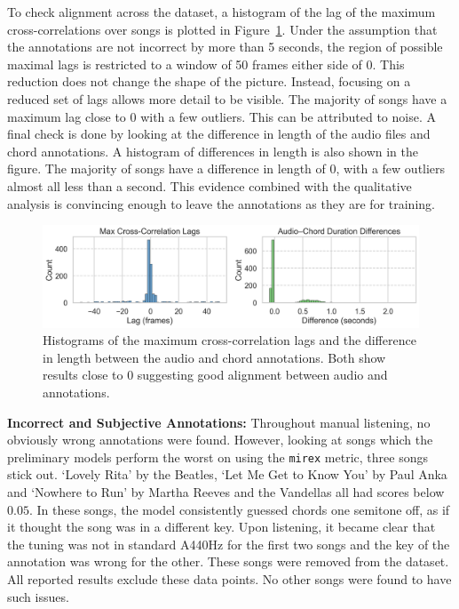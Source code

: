 To check alignment across the dataset, a histogram of the lag of the maximum cross-correlations over songs is plotted in Figure~\ref{fig:durations-and-lags}. Under the assumption that the annotations are not incorrect by more than 5 seconds, the region of possible maximal lags is restricted to a window of 50 frames either side of 0. This reduction does not change the shape of the picture. Instead, focusing on a reduced set of lags allows more detail to be visible. The majority of songs have a maximum lag close to 0 with a few outliers. This can be attributed to noise. A final check is done by looking at the difference in length of the audio files and chord annotations. A histogram of differences in length is also shown in the figure. The majority of songs have a difference in length of 0, with a few outliers almost all less than a second. This evidence combined with the qualitative analysis is convincing enough to leave the annotations as they are for training.

\begin{figure}[H]
    \centering
    \includegraphics[width=1.0\textwidth]{figures/duration_diffs_and_lags.png}
    \caption{Histograms of the maximum cross-correlation lags and the difference in length between the audio and chord annotations. Both show results close to $0$ suggesting good alignment between audio and annotations. }\label{fig:durations-and-lags}
\end{figure}

\textbf{Incorrect and Subjective Annotations:} Throughout manual listening, no obviously wrong annotations were found. However, looking at songs which the preliminary models perform the worst on using the \texttt{mirex} metric, three songs stick out. `Lovely Rita' by the Beatles, `Let Me Get to Know You' by Paul Anka and `Nowhere to Run' by Martha Reeves and the Vandellas all had scores below $0.05$. In these songs, the model consistently guessed chords one semitone off, as if it thought the song was in a different key. Upon listening, it became clear that the tuning was not in standard A440Hz for the first two songs and the key of the annotation was wrong for the other. These songs were removed from the dataset. All reported results exclude these data points. No other songs were found to have such issues.

